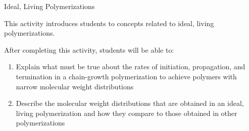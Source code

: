 %
%
%
%

\renewcommand{\figpath}{content/polymchem/livingpolyms/ideal-living-intro/figs}
\renewcommand{\labelbase}{ideal-living-intro}

\begin{activity}{Ideal, Living Polymerizations}

\begin{instructornotes}
	This activity introduces students to concepts related to ideal, living polymerizations.
	
	After completing this activity, students will be able to:
	\begin{enumerate}
		\item Explain what must be true about the rates of initiation, propagation, and termination in a chain-growth polymerization to achieve polymers with narrow molecular weight distributions 
		\item Describe the molecular weight distributions that are obtained in an ideal, living polymerization and how they compare to those obtained in other polymerizations
	\end{enumerate}
	

\end{instructornotes}
\end{activity}
